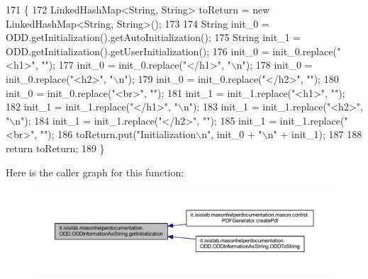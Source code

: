 \begin{DoxyCode}
171                                                                    \{
172         LinkedHashMap<String, String> toReturn = \textcolor{keyword}{new} LinkedHashMap<String, String>();
173 
174         String init\_0 = ODD.getInitialization().getAutoInitialization();
175         String init\_1 = ODD.getInitialization().getUserInitialization();
176         init\_0 = init\_0.replace(\textcolor{stringliteral}{"<h1>"}, \textcolor{stringliteral}{""});
177         init\_0 = init\_0.replace(\textcolor{stringliteral}{"</h1>"}, \textcolor{stringliteral}{"\(\backslash\)n"});
178         init\_0 = init\_0.replace(\textcolor{stringliteral}{"<h2>"}, \textcolor{stringliteral}{"\(\backslash\)n"});
179         init\_0 = init\_0.replace(\textcolor{stringliteral}{"</h2>"}, \textcolor{stringliteral}{""});
180         init\_0 = init\_0.replace(\textcolor{stringliteral}{"<br>"}, \textcolor{stringliteral}{""});
181         init\_1 = init\_1.replace(\textcolor{stringliteral}{"<h1>"}, \textcolor{stringliteral}{""});
182         init\_1 = init\_1.replace(\textcolor{stringliteral}{"</h1>"}, \textcolor{stringliteral}{"\(\backslash\)n"});
183         init\_1 = init\_1.replace(\textcolor{stringliteral}{"<h2>"}, \textcolor{stringliteral}{"\(\backslash\)n"});
184         init\_1 = init\_1.replace(\textcolor{stringliteral}{"</h2>"}, \textcolor{stringliteral}{""});
185         init\_1 = init\_1.replace(\textcolor{stringliteral}{"<br>"}, \textcolor{stringliteral}{""});
186         toReturn.put(\textcolor{stringliteral}{"Initialization\(\backslash\)n"}, init\_0 + \textcolor{stringliteral}{"\(\backslash\)n"} + init\_1);
187         
188         \textcolor{keywordflow}{return} toReturn;
189     \}
\end{DoxyCode}


Here is the caller graph for this function\-:\nopagebreak
\begin{figure}[H]
\begin{center}
\leavevmode
\includegraphics[width=350pt]{classit_1_1isislab_1_1masonhelperdocumentation_1_1_o_d_d_1_1_o_d_d_information_as_string_add26c98c3f84cb1c6f5ff39db3256842_icgraph}
\end{center}
\end{figure}


